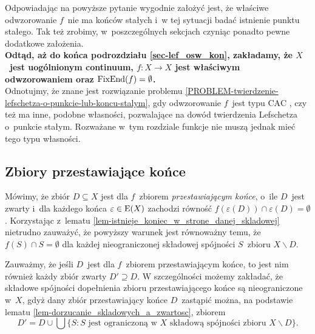 Odpowiadając na powyższe pytanie wygodnie założyć jest, że właściwe odwzorowanie $f$~nie ma końców stałych i~w tej sytuacji badać istnienie punktu stałego. Tak też zrobimy, w~poszczególnych sekcjach czyniąc ponadto pewne dodatkowe założenia.\\

\textbf{Odtąd, aż do końca podrozdziału \ref{sec-lef_osw_kon}, zakładamy, że $X$~jest uogólnionym continuum, $f\colon X\to X$ jest właściwym odwzorowaniem oraz $\operatorname{FixEnd}(f)=\emptyset$.}\\

Odnotujmy, że znane jest rozwiązanie problemu \ref{PROBLEM-twierdzenie-lefschetza-o-punkcie-lub-koncu-stalym}, gdy odwzorowanie $f$~jest typu $\mathrm{CAC}$ \cite{Gorniewicz05}, czy też ma inne, podobne własności, pozwalające na dowód twierdzenia Lefschetza o~punkcie stałym. Rozważane w~tym rozdziale funkcje nie muszą jednak mieć tego typu własności.






\subsection{Zbiory przestawiające końce}
Mówimy, że zbiór $D\subseteq X$ jest dla $f$~zbiorem \textit{przestawiającym końce}, o~ile $D$~jest zwarty i~dla każdego końca $\varepsilon \in \mathrm{E}(X)$ zachodzi równość $f(\varepsilon(D))\cap \varepsilon(D)=\emptyset$. Korzystając z~lematu \ref{lem-istnieje_koniec_w_strone_danej_skladowej} nietrudno zauważyć, że powyższy warunek jest równoważny temu, że $f(S)\cap S=\emptyset$ dla każdej nieograniczonej składowej spójności $S$~zbioru $X\smallsetminus D$.

Zauważmy, że jeśli $D$~jest dla $f$~zbiorem przestawiającym końce, to jest nim również każdy zbiór zwarty $D'\supseteq D$. W szczególności możemy zakładać, że składowe spójności dopełnienia zbioru przestawiającego końce są nieograniczone w~$X$, gdyż dany zbiór przestawiający końce $D$~zastąpić można, na podstawie lematu \ref{lem-dorzucanie_skladowych_a_zwartosc}, zbiorem \[D'=D\cup\bigcup\{S:S\text{ jest ograniczoną w } X \text{ składową spójności zbioru } X\smallsetminus D\}.\]

